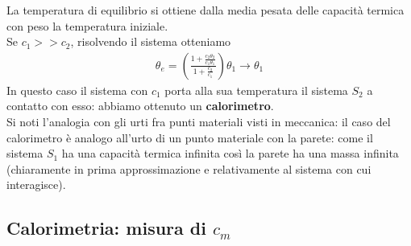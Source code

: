 \documentclass[10pt,a4paper]{article}
\begin{document}
La temperatura di equilibrio si ottiene dalla media pesata delle capacità termica con peso la temperatura iniziale.\\
Se $c_1>>c_2$, risolvendo il sistema otteniamo
\begin{align*} 
	\theta_e = \left(\frac{1+\frac{c_2\theta_2}{c_1\theta_1}}{1+\frac{c_2}{c_1}}\right)\theta_1 \to \theta_1
\end{align*} 
In questo caso il sistema con $c_1$ porta alla sua temperatura il sistema $S_2$ a contatto con esso: abbiamo ottenuto un \textbf{calorimetro}.\\
Si noti l'analogia con gli urti fra punti materiali visti in meccanica: il caso del calorimetro è analogo all'urto di un punto materiale con la parete: come il sistema $S_1$ ha una capacità termica infinita così la parete ha una massa infinita (chiaramente in prima approssimazione e relativamente al sistema con cui interagisce).
\subsection{Calorimetria: misura di $c_m$}
\end{document}
